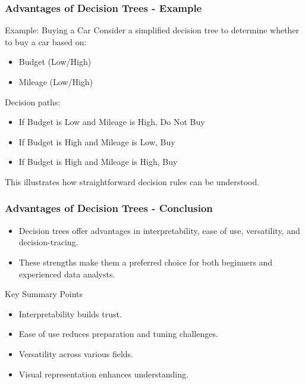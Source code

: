 \documentclass[aspectratio=169]{beamer}
\begin{document}
\begin{frame}[fragile]
    \frametitle{Advantages of Decision Trees - Example}
    \begin{block}{Example: Buying a Car}
        Consider a simplified decision tree to determine whether to buy a car based on:
        \begin{itemize}
            \item Budget (Low/High)
            \item Mileage (Low/High)
        \end{itemize}
        
        Decision paths:
        \begin{itemize}
            \item If Budget is Low and Mileage is High, Do Not Buy
            \item If Budget is High and Mileage is Low, Buy
            \item If Budget is High and Mileage is High, Buy
        \end{itemize}
        
        This illustrates how straightforward decision rules can be understood.
    \end{block}
\end{frame}

\begin{frame}[fragile]
    \frametitle{Advantages of Decision Trees - Conclusion}
    \begin{itemize}
        \item Decision trees offer advantages in interpretability, ease of use, versatility, and decision-tracing.
        \item These strengths make them a preferred choice for both beginners and experienced data analysts.
    \end{itemize}

    \begin{block}{Key Summary Points}
        \begin{itemize}
            \item Interpretability builds trust.
            \item Ease of use reduces preparation and tuning challenges.
            \item Versatility across various fields.
            \item Visual representation enhances understanding.
        \end{itemize}
    \end{block}
\end{frame}
\end{document}
